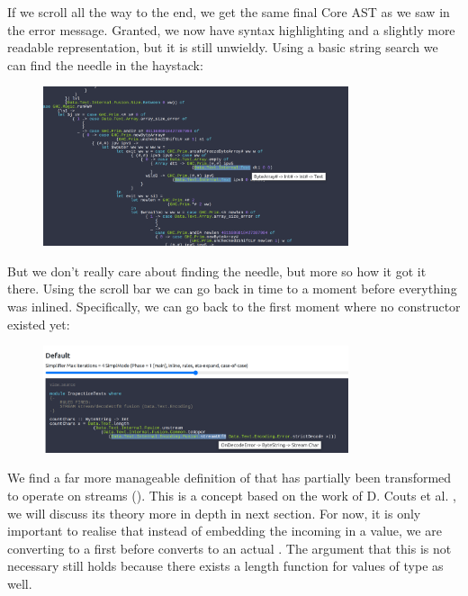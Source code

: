 If we scroll all the way to the end, we get the same final Core AST as we saw in the error message. Granted,
we now have syntax highlighting and a slightly more readable representation, but it is still unwieldy. Using
a basic string search we can find the needle in the haystack:

\begin{figure}[H]
\centering
\includegraphics[width=0.8\textwidth]{figs/countchars_3.png}
\end{figure}

But we don't really care about finding the needle, but more so how it got it there.
Using the scroll bar we can go back in time to a moment before everything was inlined.
Specifically, we can go back to the first moment where no  constructor existed yet:

\begin{figure}[H]
\centering
\includegraphics[width=0.8\textwidth]{figs/countchars_4.png}
\end{figure}

We find a far more manageable definition of  that has partially been transformed to operate on streams ().
This is a concept based on the work of D. Couts et al. \cite{stream_fusion}, we will discuss its theory more
in depth in next section. For now, it is only important to realise that instead of embedding the
incoming  in a  value, we are converting to a  first before 
converts to an actual . The argument that this is not necessary still holds because there exists a length
function for values of type  as well. 

